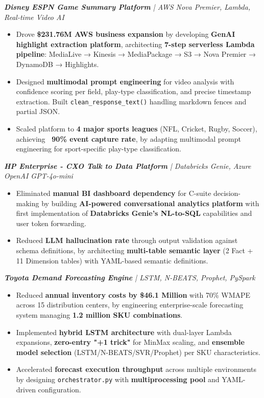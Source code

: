 \documentclass[letterpaper,10pt]{article}
\newcommand{\resumeItem}[1]{
  \item\small{
    {#1 \vspace{-2pt}}
  }
}
\newcommand{\resumeItemListStart}{\begin{itemize}}
\newcommand{\resumeItemListEnd}{\end{itemize}\vspace{-5pt}}
\begin{document}
      \vspace{12pt}
      \textit{\small\textbf{Disney ESPN Game Summary Platform} | AWS Nova Premier, Lambda, Real-time Video AI}
      \resumeItemListStart
        \resumeItem{Drove \textbf{\$231.76M AWS business expansion} by developing \textbf{GenAI highlight extraction platform}, architecting \textbf{7-step serverless Lambda pipeline}: MediaLive → Kinesis → MediaPackage → S3 → Nova Premier → DynamoDB → Highlights.}
        \resumeItem{Designed \textbf{multimodal prompt engineering} for video analysis with confidence scoring per field, play-type classification, and precise timestamp extraction. Built \texttt{clean\_response\_text()} handling markdown fences and partial JSON.}
        \resumeItem{Scaled platform to \textbf{4 major sports leagues} (NFL, Cricket, Rugby, Soccer), achieving \textbf{~90\% event capture rate}, by adapting multimodal prompt engineering for sport-specific play-type classification.}
      \resumeItemListEnd

      \vspace{12pt}
      \textit{\small\textbf{HP Enterprise - CXO Talk to Data Platform} | Databricks Genie, Azure OpenAI GPT-4o-mini}
      \resumeItemListStart
        \resumeItem{Eliminated \textbf{manual BI dashboard dependency} for C-suite decision-making by building \textbf{AI-powered conversational analytics platform} with first implementation of \textbf{Databricks Genie's NL-to-SQL} capabilities and user token forwarding.}
        \resumeItem{Reduced \textbf{LLM hallucination rate} through output validation against schema definitions, by architecting \textbf{multi-table semantic layer} (2 Fact + 11 Dimension tables) with YAML-based semantic definitions.}
      \resumeItemListEnd

      \vspace{12pt}
      \textit{\small\textbf{Toyota Demand Forecasting Engine} | LSTM, N-BEATS, Prophet, PySpark}
      \resumeItemListStart
        \resumeItem{Reduced \textbf{annual inventory costs by \$46.1 Million} with 70\% WMAPE across 15 distribution centers, by engineering enterprise-scale forecasting system managing \textbf{1.2 million SKU combinations}.}
        \resumeItem{Implemented \textbf{hybrid LSTM architecture} with dual-layer Lambda expansions, \textbf{zero-entry "+1 trick"} for MinMax scaling, and \textbf{ensemble model selection} (LSTM/N-BEATS/SVR/Prophet) per SKU characteristics.}
        \resumeItem{Accelerated \textbf{forecast execution throughput} across multiple environments by designing \texttt{orchestrator.py} with \textbf{multiprocessing pool} and YAML-driven configuration.}
      \resumeItemListEnd
\end{document}

